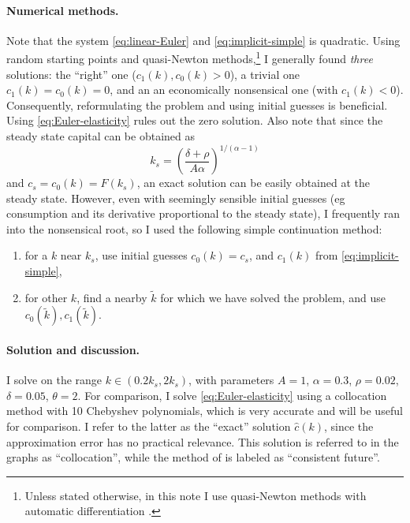 \documentclass[a4paper,11pt]{article}
\newcommand{\tk}{\tilde{k}}
\newcommand{\hc}{\hat{c}}
\begin{document}
\paragraph{Numerical methods.}

Note that the system \eqref{eq:linear-Euler} and \eqref{eq:implicit-simple} is quadratic. Using random starting points and quasi-Newton methods,\footnote{Unless stated otherwise, in this note I use quasi-Newton methods with automatic differentiation \parencite{RevelsLubinPapamarkou2016}.} I generally found  \emph{three} solutions: the ``right'' one ($c_1(k), c_0(k) > 0$), a trivial one $c_1(k) = c_0(k) = 0$, and an an economically nonsensical one (with $c_1(k) < 0$). Consequently, reformulating the problem and using initial guesses is beneficial. Using \eqref{eq:Euler-elasticity} rules out the zero solution. Also note that since the steady state capital can be obtained as
\begin{equation}
  k_s = \left(\frac{\delta+\rho}{A\alpha}\right)^{1/(\alpha-1)}
\end{equation}
and $c_s=c_0(k) = F(k_s)$, an exact solution can be easily obtained at the steady state. However, even with seemingly sensible initial guesses (eg consumption and its derivative proportional to the steady state), I frequently ran into the nonsensical root, so I used the following simple continuation method:
\begin{enumerate}
\item for a $k$ near $k_s$, use initial guesses $c_0(k)=c_s$, and $c_1(k)$ from \eqref{eq:implicit-simple},
\item for other $k$, find a nearby $\tk$ for which we have solved the problem, and use $c_0(\tk), c_1(\tk)$.
\end{enumerate}

\paragraph{Solution and discussion.}

I solve on the range $k \in (0.2 k_s, 2 k_s)$, with parameters $A=1$, $\alpha=0.3$, $\rho=0.02$, $\delta=0.05$, $\theta=2$. For comparison, I solve \eqref{eq:Euler-elasticity} using a collocation method with 10 Chebyshev polynomials, which is very accurate and will be useful for comparison. I refer to the latter as the ``exact'' solution $\hc(k)$, since the approximation error has no practical relevance. This solution is referred to in the graphs as ``collocation'', while the method of \textcite{den2015exact} is labeled as ``consistent future''.
\end{document}

